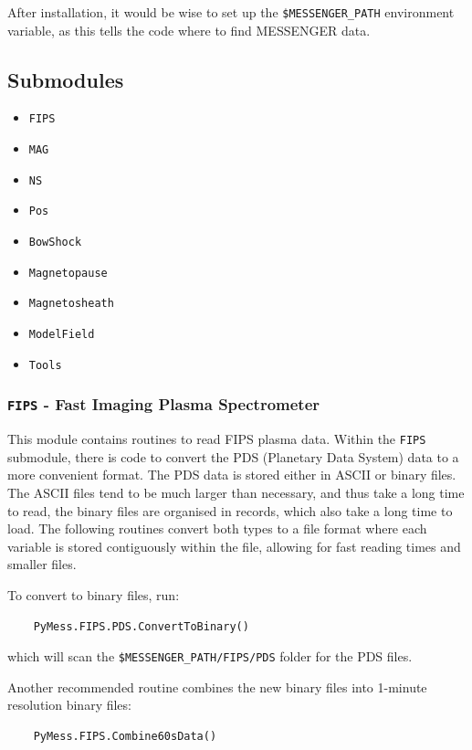 	After installation, it would be wise to set up the \texttt{\$MESSENGER\_PATH}
	environment variable, as this tells the code where to find MESSENGER
	data.
	
	
	\subsection{Submodules}
	\begin{itemize}
		\item \texttt{FIPS}
		\item \texttt{MAG}
		\item \texttt{NS}
		\item \texttt{Pos}
		\item \texttt{BowShock}
		\item \texttt{Magnetopause}
		\item \texttt{Magnetosheath}
		\item \texttt{ModelField}
		\item \texttt{Tools}
	\end{itemize}
	
	\subsubsection{\texttt{FIPS} - Fast Imaging Plasma Spectrometer}
	
	This module contains routines to read FIPS plasma data. Within the \texttt{FIPS}
	submodule, there is code to convert the PDS (Planetary Data System) data
	to a more convenient format. The PDS data is stored either in ASCII or
	binary files. The ASCII files tend to be much larger than necessary, and 
	thus take a long time to read, the binary files are organised in records,
	which also take a long time to load. The following routines convert both
	types to a file format where each variable is stored contiguously within
	the file, allowing for fast reading times and smaller files.
	
	To convert to binary files, run:
	
	\begin{verbatim}
	PyMess.FIPS.PDS.ConvertToBinary()
	\end{verbatim}
	
	which will scan the \texttt{\$MESSENGER\_PATH/FIPS/PDS} folder for the PDS files.
	
	Another recommended routine combines the new binary files into 1-minute 
	resolution binary files:
	
	\begin{verbatim}
	PyMess.FIPS.Combine60sData()
	\end{verbatim}
	
